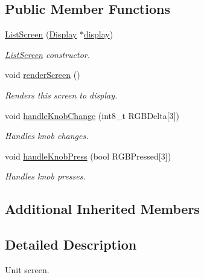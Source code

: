 \subsection*{Public Member Functions}
\begin{DoxyCompactItemize}
\item 
\mbox{\hyperlink{classListScreen_a502ff7cf893ae6d10ed7bc1ca7a8ffe8}{List\+Screen}} (\mbox{\hyperlink{classDisplay}{Display}} $\ast$\mbox{\hyperlink{classScreen_aad713267725e8aa8a8def951a07de641}{display}})
\begin{DoxyCompactList}\small\item\em \mbox{\hyperlink{classListScreen}{List\+Screen}} constructor. \end{DoxyCompactList}\item 
\mbox{\label{classListScreen_a364b4ccc88650c13295efae8431b135e}} 
void \mbox{\hyperlink{classListScreen_a364b4ccc88650c13295efae8431b135e}{render\+Screen}} ()
\begin{DoxyCompactList}\small\item\em Renders this screen to display. \end{DoxyCompactList}\item 
\mbox{\label{classListScreen_a4e0f2e67dbfbcf8560209f01d2cab1c6}} 
void \mbox{\hyperlink{classListScreen_a4e0f2e67dbfbcf8560209f01d2cab1c6}{handle\+Knob\+Change}} (int8\+\_\+t R\+G\+B\+Delta\mbox{[}3\mbox{]})
\begin{DoxyCompactList}\small\item\em Handles knob changes. \end{DoxyCompactList}\item 
\mbox{\label{classListScreen_aecf861357be2b6debde43e61c9a7671b}} 
void \mbox{\hyperlink{classListScreen_aecf861357be2b6debde43e61c9a7671b}{handle\+Knob\+Press}} (bool R\+G\+B\+Pressed\mbox{[}3\mbox{]})
\begin{DoxyCompactList}\small\item\em Handles knob presses. \end{DoxyCompactList}\end{DoxyCompactItemize}
\subsection*{Additional Inherited Members}


\subsection{Detailed Description}
Unit screen. 

